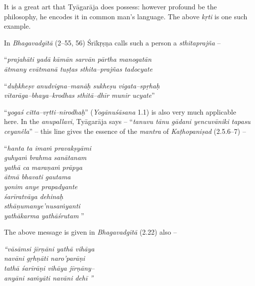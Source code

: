 It is a great art that Tyāgarāja does possess: however profound be the philosophy, he encodes it in common man’s language. The above \textit{kṛti} is one such example. 

In \textit{Bhagavadgītā} (2–55, 56) Śrīkṛṣṇa calls such a person a \textit{sthitaprajña} –

\begin{myquote}
“\textit{prajahāti yadā kāmān sarvān pārtha manogatān }\\\textit{ātmany evātmanā tuṣṭas sthita–prajñas tadocyate} 
\end{myquote}

\begin{myquote}
“\textit{duḥkheṣv anudvigna–manāḥ sukheṣu vigata–spṛhaḥ }\\\textit{vītarāga–bhaya–krodhas sthitā–dhīr munir ucyate}”  
\end{myquote}

“\textit{yogaś citta–vṛtti–nirodhaḥ}” (\textit{Yogānuśāsana} 1.1) is also very much applicable here. In the \textit{anupallavi}, Tyāgarāja says – “\textit{tanuvu tānu gādani yencuvāniki tapasu ceyanêla}” – this line gives the essence of the \textit{mantra} of \textit{Kaṭhopaniṣad} (2.5.6–7) –

\begin{myquote}
“\textit{hanta ta imaṁ pravakṣyāmi}\\\textit{guhyaṁ brahma sanātanam }\\\textit{yathā ca maraṇaṁ prāpya}\\\textit{ātmā bhavati gautama }\\\textit{yonim anye prapadyante}\\\textit{śarīratvāya dehinaḥ }\\\textit{sthāṇumanye’nusaṁyanti}\\\textit{yathākarma yathāśrutam} ”
\end{myquote}

The above message is given in \textit{Bhagavadgītā} (2.22) also –

\begin{myquote}
\textit{“vāsāmsi jīrṇāni yathā vihāya}\\\textit{navāni gṛhṇāti naro’parāṇi }\\\textit{tathā śarīrāṇi vihāya jīrṇāny–}\\\textit{anyāni saṁyāti navāni dehī ”}
\end{myquote}

